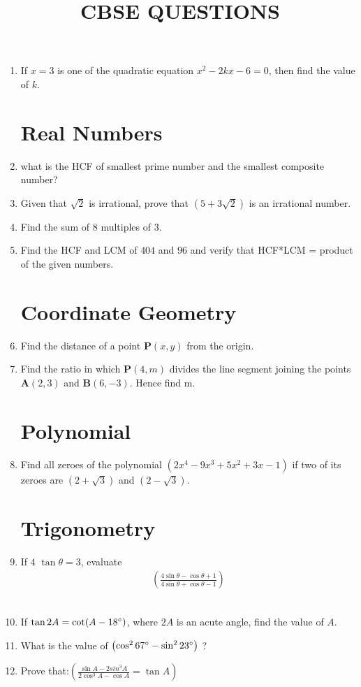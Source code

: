 \documentclass{article}
\let\vec\mathbf
\providecommand{\brak}[1]{\ensuremath{\left(#1\right)}}
\begin{document}
\title{\textbf{CBSE QUESTIONS}}
\date{}
\maketitle{}
\begin{enumerate}

		\section{Quadratic Equations}
\item If $x=3$ is one of the quadratic equation $x^2-2kx-6= 0$, then find the value of $k$.
	\section{Real Numbers}
	\item what is the HCF of smallest prime number and the smallest composite number?
	\item Given that $\sqrt{2}$ is irrational, prove that $\brak{5+3\sqrt2}$ is an irrational number.
	\item Find the sum of $8$ multiples of $3$.
	\item Find the HCF and LCM of $404$ and $96$ and verify that HCF*LCM = product of the given numbers.
		\section{Coordinate Geometry}
			\item Find the distance of a point $\vec{P}(x,y)$ from the origin.
			\item Find the ratio in which $\vec{P}(4,m)$ divides the line segment joining the points $\vec{A}(2,3)$ and $\vec{B}(6,-3)$. Hence find m.
		\section{Polynomial}
			\item Find all zeroes of the polynomial $\brak{2x^4-9x^3+5x^2+3x-1}$ if two of its zeroes are $\brak{2+\sqrt3}$ and $\brak{2-\sqrt3}$.
		\section{Trigonometry}
			\item If $4$ $\tan\theta=3$, evaluate \begin{align*}\brak {\frac{4 \sin\theta - \cos\theta + 1 }{ 4 \sin\theta + \cos\theta - 1 } } \end{align*}   \\
\item If $\tan2A = \cot(A-18\degree)$, where $2A$ is an acute angle, find the value of $A$.
\item What is the value of $ \brak{\cos^2 67\degree - \sin^2 23\degree}$ ?
\item  Prove that:$\brak{\frac{\sin A - 2sin^3 A}{2 \cos^3 A-\cos A} = \tan A }$

\end{enumerate}
\end{document}
